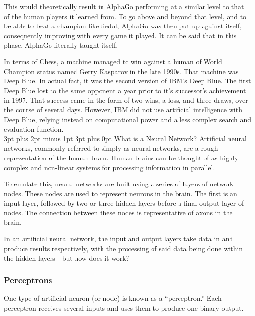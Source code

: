 \documentclass[12pt,a4paper]{article}
\makeatletter
\renewcommand\subsection{\@startsection {subsection}{1}{2mm} %
                               {3pt plus 2pt minus 1pt} %
                               {3pt plus 0pt} %
                               {\normalfont\bfseries}}
\makeatother
\begin{document}
This would theoretically result in AlphaGo performing at a similar level to that of the human players it learned from. To go above and beyond that level, and to be able to beat a champion like Sedol, AlphaGo was then put up against itself, consequently improving with every game it played\citep{13}. It can be said that in this phase, AlphaGo literally taught itself. 

In terms of Chess, a machine managed to win against a human of World Champion status named Gerry Kasparov in the late 1990s\citep{14}. That machine was Deep Blue. In actual fact, it was the second version of IBM's Deep Blue. The first Deep Blue lost to the same opponent a year prior to it's successor's achievement in 1997\citep{14}. That success came in the form of two wins, a loss, and three draws\citep{15}, over the course of several days. However, IBM did not use artificial intelligence with Deep Blue, relying instead on computational power and a less complex search and evaluation function\citep{16}. \\

\subsection{What is a Neural Network?}
Artificial neural networks, commonly referred to simply as neural networks, are a rough representation of the human brain. Human brains can be thought of as highly complex and non-linear systems for processing information in parallel\citep{NeuralNetworksAComprehensiveFoundation}. 

To emulate this, neural networks are built using a series of layers of network nodes. These nodes are used to represent neurons in the brain. The first is an input layer, followed by two or three hidden layers before a final output layer of nodes\citep{ArtificialNeuralNetwork}. The connection between these nodes is representative of axons in the brain. 

In an artificial neural network, the input and output layers take data in and produce results respectively, with the processing of said data being done within the hidden layers - but how does it work? 

\subsubsection{Perceptrons}
One type of artificial neuron (or node) is known as a \enquote{perceptron.} Each perceptron receives several inputs and uses them to produce one binary output\citep{NeuralNetworksAndDeepLearning}.  
\end{document}
